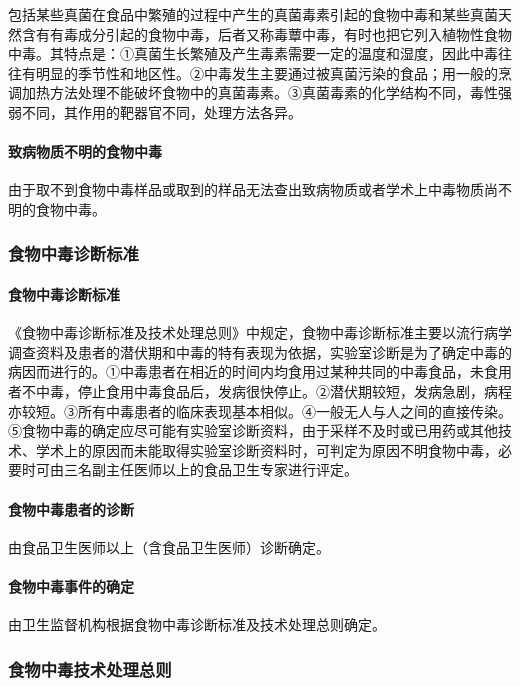 包括某些真菌在食品中繁殖的过程中产生的真菌毒素引起的食物中毒和某些真菌天然含有有毒成分引起的食物中毒，后者又称毒蕈中毒，有时也把它列入植物性食物中毒。其特点是：①真菌生长繁殖及产生毒素需要一定的温度和湿度，因此中毒往往有明显的季节性和地区性。②中毒发生主要通过被真菌污染的食品；用一般的烹调加热方法处理不能破坏食物中的真菌毒素。③真菌毒素的化学结构不同，毒性强弱不同，其作用的靶器官不同，处理方法各异。

\paragraph{致病物质不明的食物中毒}

由于取不到食物中毒样品或取到的样品无法查出致病物质或者学术上中毒物质尚不明的食物中毒。

\subsubsection{食物中毒诊断标准}

\paragraph{食物中毒诊断标准}

《食物中毒诊断标准及技术处理总则》中规定，食物中毒诊断标准主要以流行病学调查资料及患者的潜伏期和中毒的特有表现为依据，实验室诊断是为了确定中毒的病因而进行的。①中毒患者在相近的时间内均食用过某种共同的中毒食品，未食用者不中毒，停止食用中毒食品后，发病很快停止。②潜伏期较短，发病急剧，病程亦较短。③所有中毒患者的临床表现基本相似。④一般无人与人之间的直接传染。⑤食物中毒的确定应尽可能有实验室诊断资料，由于采样不及时或已用药或其他技术、学术上的原因而未能取得实验室诊断资料时，可判定为原因不明食物中毒，必要时可由三名副主任医师以上的食品卫生专家进行评定。

\paragraph{食物中毒患者的诊断}

由食品卫生医师以上（含食品卫生医师）诊断确定。

\paragraph{食物中毒事件的确定}

由卫生监督机构根据食物中毒诊断标准及技术处理总则确定。

\subsubsection{食物中毒技术处理总则}


